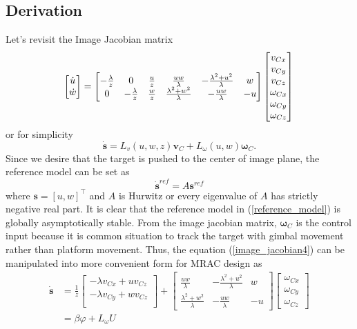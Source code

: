 \subsection{Derivation}
Let's revisit the Image Jacobian matrix
\begin{equation}
\begin{bmatrix}
\dot{u} \\ \dot{w}
\end{bmatrix}
=\begin{bmatrix}
-\frac{\lambda}{z} & 0 & \frac{u}{z} & \frac{uw}{\lambda} & -\frac{\lambda^2+u^2}{\lambda} & w \\
0 & -\frac{\lambda}{z} & \frac{w}{z} & \frac{\lambda^2+w^2}{\lambda} & -\frac{uw}{\lambda} & -u
\end{bmatrix}
\begin{bmatrix}
v_{Cx} \\ v_{Cy} \\ v_{Cz} \\
\omega_{Cx} \\ \omega_{Cy} \\ \omega_{Cz}
\end{bmatrix}\\
\label{image_jacobian4}
\end{equation}
or for simplicity
\begin{equation}
\mathbf{\dot{s}}=L_v(u,w,z)\mathbf{v}_C+L_{\omega}(u,w)\mathbf{\omega}_C.
\end{equation}
Since we desire that the target is pushed to the center of image plane, the reference model can be set as 
\begin{equation}
\mathbf{\dot{s}}^{ref}=A\mathbf{s}^{ref}
\label{reference_model}
\end{equation}
where $\mathbf{s}=[u, w]^\top$ and $A$ is Hurwitz or every eigenvalue of $A$ has strictly negative real part. It is clear that the reference model in (\ref{reference_model}) is globally asymptotically stable. From the image jacobian matrix, $\mathbf{\omega}_C$ is the control input because it is common situation to track the target with gimbal movement rather than platform movement. Thus, the equation (\ref{image_jacobian4}) can be manipulated into more convenient form for MRAC design as 
\begin{align}
\mathbf{\dot{s}}
&=\frac{1}{z}
\begin{bmatrix}
-\lambda v_{Cx}+uv_{Cz} \\
-\lambda v_{Cy}+wv_{Cz} \\
\end{bmatrix}
+\begin{bmatrix}
\frac{uw}{\lambda} & -\frac{\lambda^2+u^2}{\lambda} & w \\
\frac{\lambda^2+w^2}{\lambda} & -\frac{uw}{\lambda} & -u
\end{bmatrix}
\begin{bmatrix}
\omega_{Cx} \\ \omega_{Cy} \\ \omega_{Cz}
\end{bmatrix}
\\&=\beta\varphi + L_{\omega}U
\label{adaptive_image_jacobian}
\end{align}
